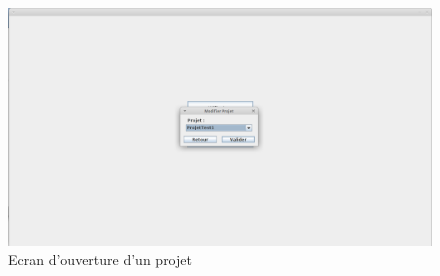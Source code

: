 \documentclass[12pt]{report}
\begin{document}
\begin{figure}
\centering
\includegraphics[scale=0.3]{IHM/selection_modifier_projet.png}
\caption{Ecran d'ouverture d'un projet}
\end{figure}
\end{document}
